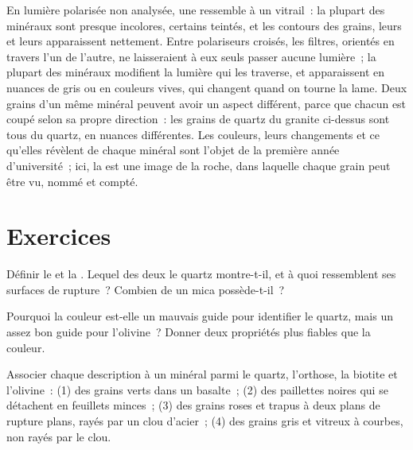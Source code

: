 En lumière polarisée non analysée, une  ressemble à un vitrail~:
la plupart des minéraux sont presque incolores, certains teintés, et les
contours des grains, leurs  et leurs  apparaissent
nettement. Entre polariseurs croisés, les filtres, orientés en travers l'un
de l'autre, ne laisseraient à eux seuls passer aucune lumière~; la plupart
des minéraux modifient la lumière qui les traverse, et apparaissent en
nuances de gris ou en couleurs vives, qui changent quand on tourne la lame.
Deux grains d'un même minéral peuvent avoir un aspect différent, parce que
chacun est coupé selon sa propre direction~: les grains de quartz du granite
ci-dessus sont tous du quartz, en nuances différentes. Les couleurs, leurs
changements et ce qu'elles révèlent de chaque minéral sont l'objet de la
première année d'université~; ici, la  est une image de la roche,
dans laquelle chaque grain peut être vu, nommé et compté.

\section{Exercices}

\begin{exercise}[$\star$]\label{exo:g11:minerals:1}
Définir le  et la . Lequel des deux le quartz montre-t-il, et
à quoi ressemblent ses surfaces de rupture~? Combien de  un mica
possède-t-il~?
\end{exercise}

\begin{exercise}[$\star$]\label{exo:g11:minerals:2}
Pourquoi la couleur est-elle un mauvais guide pour identifier le quartz,
mais un assez bon guide pour l'olivine~? Donner deux propriétés plus fiables
que la couleur.
\end{exercise}

\begin{exercise}[$\star$]\label{exo:g11:minerals:3}
Associer chaque description à un minéral parmi le quartz, l'orthose, la
biotite et l'olivine~: (1) des grains verts dans un basalte~; (2) des
paillettes noires qui se détachent en feuillets minces~; (3) des grains
roses et trapus à deux plans de rupture plans, rayés par un clou
d'acier~; (4) des grains gris et vitreux à  courbes, non rayés par
le clou.
\end{exercise}

